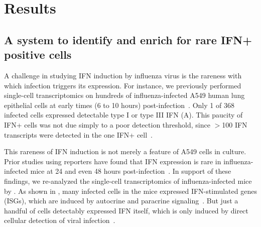 \documentclass[9pt,lineno]{elife}
\begin{document}
\section{Results}

\subsection{A system to identify and enrich for rare IFN+ positive cells}
A challenge in studying IFN induction by influenza virus is the rareness with which infection triggers its expression.
For instance, we previously performed single-cell transcriptomics on hundreds of influenza-infected A549 human lung epithelial cells at early times (6 to 10 hours) post-infection~\citep{russell2018extreme}.
Only 1 of 368 infected cells expressed detectable type I or type III IFN (A).
This paucity of IFN+ cells was not due simply to a poor detection threshold, since $>$100 IFN transcripts were detected in the one IFN+ cell~\citep{russell2018extreme}.

This rareness of IFN induction is not merely a feature of A549 cells in culture.
Prior studies using reporters have found that IFN expression is rare in influenza-infected mice at 24 and even 48 hours post-infection~\citep{kallfass2013visualizing}.
In support of these findings, we re-analyzed the single-cell transcriptomics of influenza-infected mice by \citet{steuerman2018dissection}.
As shown in , many infected cells in the mice expressed IFN-stimulated genes (ISGs), which are induced by autocrine and paracrine signaling~\citep{stetson2006type,honda2006type}.
But just a handful of cells detectably expressed IFN itself, which is only induced by direct cellular detection of viral infection~\citep{stetson2006type,honda2006type}.
\end{document}
